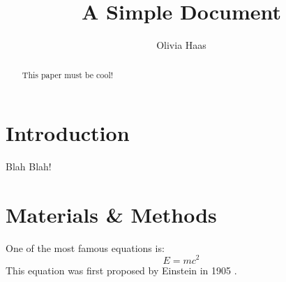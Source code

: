 \documentclass[12pt]{article}
\title{A Simple Document}
\author{Olivia Haas}
\date{}
\begin{document}
    \maketitle

    \begin{abstract}
        This paper must be cool!
    \end{abstract}

    \section{Introduction}
        Blah Blah!

    \section{Materials \& Methods}
        One of the most famous equations is:
    \begin{equation}
        E=mc^2
    \end{equation}
        This equation was first proposed by Einstein in 1905
    \cite{einstein1905does}.

    
    
\end{document}
